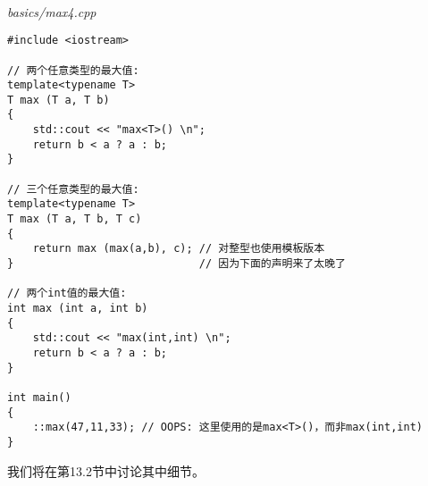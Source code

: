 \hspace*{\fill} \\ %
\noindent
\textit{basics/max4.cpp}
\begin{lstlisting}[style=styleCXX]
#include <iostream>

// 两个任意类型的最大值:
template<typename T>
T max (T a, T b)
{
	std::cout << "max<T>() \n";
	return b < a ? a : b;
}

// 三个任意类型的最大值:
template<typename T>
T max (T a, T b, T c)
{
	return max (max(a,b), c); // 对整型也使用模板版本
}                             // 因为下面的声明来了太晚了
                              
// 两个int值的最大值:
int max (int a, int b)
{
	std::cout << "max(int,int) \n";
	return b < a ? a : b;
}

int main()
{
	::max(47,11,33); // OOPS: 这里使用的是max<T>()，而非max(int,int)
}
\end{lstlisting}

我们将在第13.2节中讨论其中细节。


